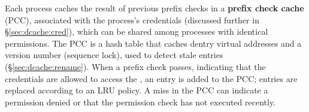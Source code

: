 Each process caches the result of previous prefix checks
in a {\bf prefix check cache} (PCC), associated with the process's credentials
(discussed further in \S\ref{sec:dcache:cred}), which can be shared among processes
with identical permissions.
The PCC is a hash table that caches dentry virtual addresses 
and a version number (sequence lock), used to detect stale entries (\S\ref{sec:dcache:rename}).
When a prefix check passes, indicating that the credentials are allowed to access the \dentry{}, 
an entry is added to the PCC; entries are replaced according to an LRU policy.
A miss in the PCC can indicate a permission denied
or 
that the permission check has not executed recently.

